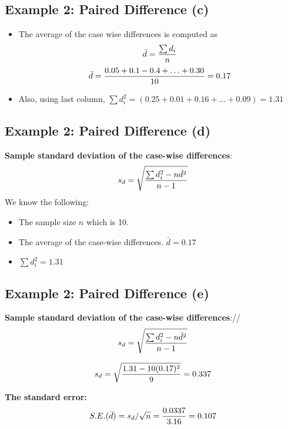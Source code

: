 \begin{frame}
\subsection*{Example 2: Paired Difference (c)}
\begin{itemize}
\item The average of the case wise differences is computed as \[\bar{d} = {\sum d_i \over n}\]
\[ \bar{d} = { 0.05 + 0.1  - 0.4 + \ldots + 0.30 \over 10 }= 0.17 \]
\item Also, using last column, $\sum d^2_i = (0.25 + 0.01 + 0.16 + \ldots + 0.09) = 1.31$
\end{itemize}

\end{frame}


\begin{frame}
\subsection*{Example 2: Paired Difference (d)}
\textbf{Sample standard deviation of the case-wise differences}:
\large
\[s_d = \sqrt{ {\sum d_i^2 - n\bar{d}^2 \over n-1}}\]
We know the following:
\begin{itemize}
\item The sample size $n$ which is 10.
\item The average of the case-wise differences. $\bar{d} = 0.17$
\item  $\sum d^2_i = 1.31$
\end{itemize}
\end{frame}



\begin{frame}
\subsection*{Example 2: Paired Difference (e)}
\textbf{Sample standard deviation  of the case-wise differences}://
\[s_d = \sqrt{ {\sum d_i^2 - n\bar{d}^2 \over n-1}}\]

\[s_d = \sqrt{ { 1.31 - 10(0.17)^2 \over 9}} = 0.337\]

\textbf{The standard error:} \[ S.E.(\bar{d}) = s_d / \sqrt{n} = {0.0337 \over 3.16} = 0.107\]
\end{frame}

